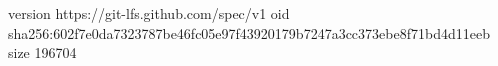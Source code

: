 version https://git-lfs.github.com/spec/v1
oid sha256:602f7e0da7323787be46fc05e97f43920179b7247a3cc373ebe8f71bd4d11eeb
size 196704
